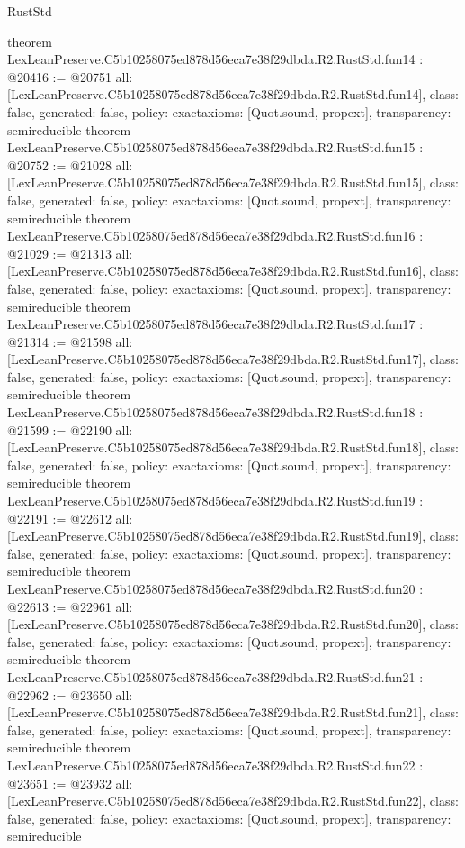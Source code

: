 \begin{lexlean}{RustStd}
\begin{coremodule}
{}
theorem LexLeanPreserve.C5b10258075ed878d56eca7e38f29dbda.R2.RustStd.fun14 : @20416 := @20751 {
  all: [LexLeanPreserve.C5b10258075ed878d56eca7e38f29dbda.R2.RustStd.fun14],
  class: false,
  generated: false,
  policy: exact{axioms: [Quot.sound, propext]},
  transparency: semireducible
}
theorem LexLeanPreserve.C5b10258075ed878d56eca7e38f29dbda.R2.RustStd.fun15 : @20752 := @21028 {
  all: [LexLeanPreserve.C5b10258075ed878d56eca7e38f29dbda.R2.RustStd.fun15],
  class: false,
  generated: false,
  policy: exact{axioms: [Quot.sound, propext]},
  transparency: semireducible
}
theorem LexLeanPreserve.C5b10258075ed878d56eca7e38f29dbda.R2.RustStd.fun16 : @21029 := @21313 {
  all: [LexLeanPreserve.C5b10258075ed878d56eca7e38f29dbda.R2.RustStd.fun16],
  class: false,
  generated: false,
  policy: exact{axioms: [Quot.sound, propext]},
  transparency: semireducible
}
theorem LexLeanPreserve.C5b10258075ed878d56eca7e38f29dbda.R2.RustStd.fun17 : @21314 := @21598 {
  all: [LexLeanPreserve.C5b10258075ed878d56eca7e38f29dbda.R2.RustStd.fun17],
  class: false,
  generated: false,
  policy: exact{axioms: [Quot.sound, propext]},
  transparency: semireducible
}
theorem LexLeanPreserve.C5b10258075ed878d56eca7e38f29dbda.R2.RustStd.fun18 : @21599 := @22190 {
  all: [LexLeanPreserve.C5b10258075ed878d56eca7e38f29dbda.R2.RustStd.fun18],
  class: false,
  generated: false,
  policy: exact{axioms: [Quot.sound, propext]},
  transparency: semireducible
}
theorem LexLeanPreserve.C5b10258075ed878d56eca7e38f29dbda.R2.RustStd.fun19 : @22191 := @22612 {
  all: [LexLeanPreserve.C5b10258075ed878d56eca7e38f29dbda.R2.RustStd.fun19],
  class: false,
  generated: false,
  policy: exact{axioms: [Quot.sound, propext]},
  transparency: semireducible
}
theorem LexLeanPreserve.C5b10258075ed878d56eca7e38f29dbda.R2.RustStd.fun20 : @22613 := @22961 {
  all: [LexLeanPreserve.C5b10258075ed878d56eca7e38f29dbda.R2.RustStd.fun20],
  class: false,
  generated: false,
  policy: exact{axioms: [Quot.sound, propext]},
  transparency: semireducible
}
theorem LexLeanPreserve.C5b10258075ed878d56eca7e38f29dbda.R2.RustStd.fun21 : @22962 := @23650 {
  all: [LexLeanPreserve.C5b10258075ed878d56eca7e38f29dbda.R2.RustStd.fun21],
  class: false,
  generated: false,
  policy: exact{axioms: [Quot.sound, propext]},
  transparency: semireducible
}
theorem LexLeanPreserve.C5b10258075ed878d56eca7e38f29dbda.R2.RustStd.fun22 : @23651 := @23932 {
  all: [LexLeanPreserve.C5b10258075ed878d56eca7e38f29dbda.R2.RustStd.fun22],
  class: false,
  generated: false,
  policy: exact{axioms: [Quot.sound, propext]},
  transparency: semireducible
}
\end{coremodule}
\end{lexlean}

